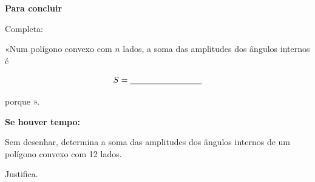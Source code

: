 

\begin{tcolorbox}[
colback=azulClaro,
colframe=azulPDMI!40,
boxrule=.5pt,
arc=2mm,
left=7pt,
right=7pt,
top=5pt,
bottom=5pt
]

\textbf{Para concluir}

Completa:

«Num polígono convexo com $n$ lados,
a soma das amplitudes dos ângulos
internos é

\[
S=\underline{\hspace{3.0cm}}
\]

porque
\underline{\hspace{4cm}}».

\end{tcolorbox}

\vspace{2pt}

{\footnotesize\itshape

\textbf{Se houver tempo:}

Sem desenhar, determina a soma das
amplitudes dos ângulos internos
de um polígono convexo com 12 lados.

Justifica.

}
